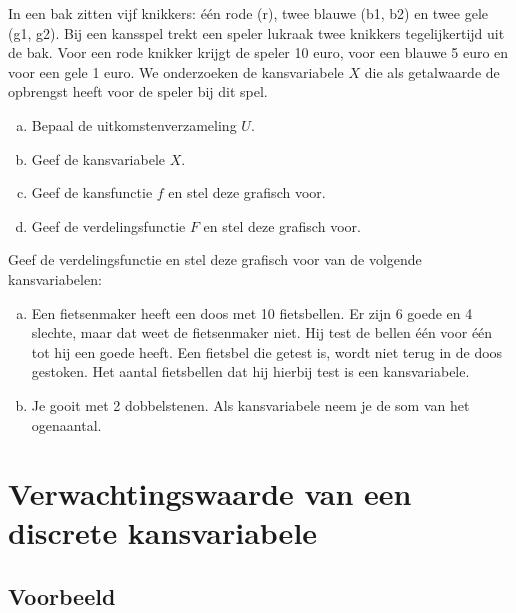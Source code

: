 \documentclass[12pt,twoside]{article}
\begin{document}
\begin{oefening}
In een bak zitten vijf knikkers: één rode (r), twee blauwe (b1, b2) en twee gele (g1, g2). Bij een kansspel trekt een speler lukraak twee knikkers tegelijkertijd uit de bak. Voor een rode knikker krijgt de speler 10 euro, voor een blauwe 5 euro en voor een gele 1 euro.
We onderzoeken de kansvariabele $X$ die als getalwaarde de opbrengst heeft voor de speler bij dit spel.
\begin{enumerate}[(a)]
  \item Bepaal de uitkomstenverzameling $U$.
  \item Geef de kansvariabele $X$.
  \item Geef de kansfunctie $f$ en stel deze grafisch voor.
  \item Geef de verdelingsfunctie $F$ en stel deze grafisch voor.
\end{enumerate}
\end{oefening}

\begin{oefening}
Geef de verdelingsfunctie en stel deze grafisch voor van de volgende kansvariabelen:
\begin{enumerate}[(a)]
  \item Een fietsenmaker heeft een doos met 10 fietsbellen. Er zijn 6 goede en 4 slechte, maar dat weet de fietsenmaker niet. Hij test de bellen één voor één tot hij een goede heeft. Een fietsbel die getest is, wordt niet terug in de doos gestoken. Het aantal fietsbellen dat hij hierbij test is een kansvariabele.
  \item Je gooit met 2 dobbelstenen. Als kansvariabele neem je de som van het ogenaantal.
\end{enumerate}
\end{oefening}

\pagebreak

\section{Verwachtingswaarde van een discrete kansvariabele}

\subsection{Voorbeeld}
\end{document}
